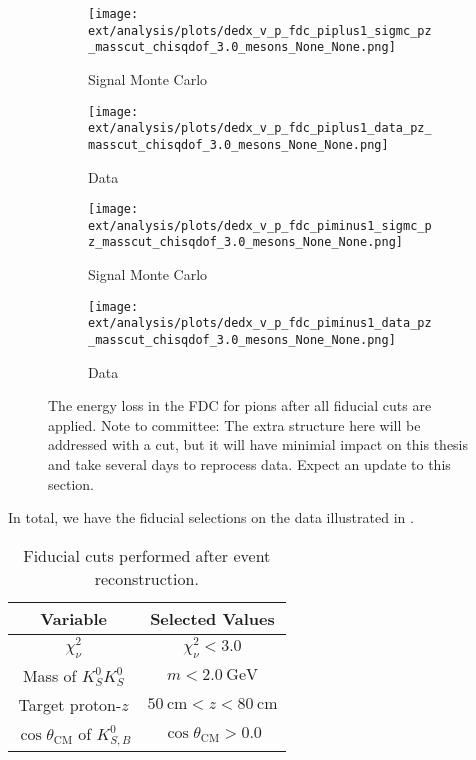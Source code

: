 \begin{figure}
    \centering
    \begin{subfigure}{0.45\textwidth}
        \texttt{[image: ext/analysis/plots/dedx\_v\_p\_fdc\_piplus1\_sigmc\_pz\_masscut\_chisqdof\_3.0\_mesons\_None\_None.png]}
        \caption{Signal Monte Carlo}
    \end{subfigure}
    \hfill
    \begin{subfigure}{0.45\textwidth}
        \texttt{[image: ext/analysis/plots/dedx\_v\_p\_fdc\_piplus1\_data\_pz\_masscut\_chisqdof\_3.0\_mesons\_None\_None.png]}
        \caption{Data}
    \end{subfigure}
    \vspace{1em}
    \begin{subfigure}{0.45\textwidth}
        \texttt{[image: ext/analysis/plots/dedx\_v\_p\_fdc\_piminus1\_sigmc\_pz\_masscut\_chisqdof\_3.0\_mesons\_None\_None.png]}
        \caption{Signal Monte Carlo}
    \end{subfigure}
    \hfill
    \begin{subfigure}{0.45\textwidth}
        \texttt{[image: ext/analysis/plots/dedx\_v\_p\_fdc\_piminus1\_data\_pz\_masscut\_chisqdof\_3.0\_mesons\_None\_None.png]}
        \caption{Data}
    \end{subfigure}
    \caption{The energy loss in the FDC for pions after all fiducial cuts are applied. {\color{red}Note to committee: The extra structure here will be addressed with a cut, but it will have minimial impact on this thesis and take several days to reprocess data. Expect an update to this section.}}\label{fig:dedx-v-p-fdc-pions-pz-masscut-chisqdof-3.0-mesons}
\end{figure}

In total, we have the fiducial selections on the data illustrated in .

\begin{table}
  \begin{center}
    \begin{tabular}{cc}\toprule
      Variable & Selected Values \\\midrule
      $\chi^2_\nu$ & $\chi^2_\nu < 3.0$ \\
      Mass of $K_S^0K_S^0$ & $ m < \SI{2.0}{\giga\electronvolt} $ \\
      Target proton-$z$ & $\SI{50}{\centi\meter} < z < \SI{80}{\centi\meter}$ \\
      $\cos\theta_{\text{CM}}$ of $K_{S,B}^0$ & $ \cos\theta_{\text{CM}} > 0.0 $ \\\bottomrule
    \end{tabular}
    \caption{Fiducial cuts performed after event reconstruction.}\label{tab:fiducial-cuts}
  \end{center}
\end{table}
